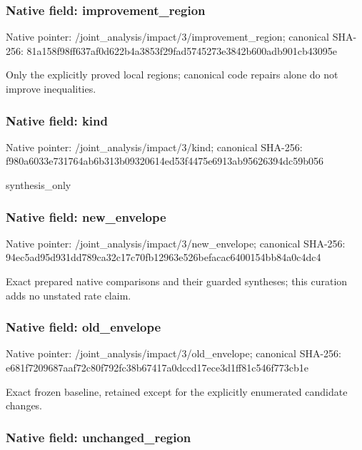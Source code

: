 \documentclass[10pt,a4paper]{article}
\begin{document}
\subsubsection{Native field: improvement\_region}


Native pointer: /joint\_analysis/impact/3\allowbreak{}/improvement\_region; canonical SHA-256: 81a158f98ff637af0d622b4a\allowbreak{}3853f29fad5745273e3842b6\allowbreak{}00adb901cb43095e


Only the explicitly proved local regions; canonical code repairs alone do not improve inequalities.


\subsubsection{Native field: kind}


Native pointer: /joint\_analysis/impact/3/kind; canonical SHA-256: f980a6033e731764ab6b313b\allowbreak{}09320614ed53f4475e6913ab\allowbreak{}95626394dc59b056


synthesis\_only


\subsubsection{Native field: new\_envelope}


Native pointer: /joint\_analysis/impact/3/new\_envelope; canonical SHA-256: 94ec5ad95d931dd789ca32c1\allowbreak{}7c70fb12963e526befacac64\allowbreak{}00154bb84a0c4dc4


Exact prepared native comparisons and their guarded syntheses; this curation adds no unstated rate claim.


\subsubsection{Native field: old\_envelope}


Native pointer: /joint\_analysis/impact/3/old\_envelope; canonical SHA-256: e681f7209687aaf72c80f792\allowbreak{}fc38b67417a0dccd17ece3d1\allowbreak{}ff81c546f773cb1e


Exact frozen baseline, retained except for the explicitly enumerated candidate changes.


\subsubsection{Native field: unchanged\_region}
\end{document}
